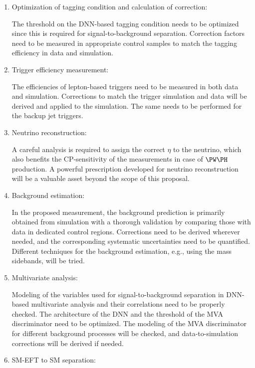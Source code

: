 \documentclass[a4paper,11pt]{article}
\begin{document}
\begin{enumerate}
\item Optimization of \PH tagging condition and calculation of correction:

The threshold on the DNN-based \PH tagging condition needs to be optimized since this is required for signal-to-background separation. 
Correction factors 
need to be measured in appropriate control samples
to match the tagging efficiency in data and simulation.

\item Trigger efficiency measurement:

The efficiencies of lepton-based triggers need to be measured in both data and simulation. 
Corrections to match the trigger simulation and data will be derived and applied to the simulation. 
The same needs to be performed for the backup jet triggers. 

\item Neutrino reconstruction:

A careful analysis is required to assign the correct $\eta$ to the neutrino, which also benefits the CP-sensitivity of the measurements in case of $\PW\PH$ production. 
A powerful prescription developed for neutrino reconstruction 
will be a valuable asset beyond the scope of this proposal.

\item Background estimation:

In the proposed measurement, 
the background prediction is primarily obtained
from simulation with a thorough validation by comparing those with data in dedicated control regions. 
Corrections need to be derived wherever needed, and the corresponding systematic uncertainties need to be quantified.   
Different techniques for the background estimation, e.g., using the mass sidebands, will be tried.

\item Multivariate analysis: 

Modeling of the variables used for signal-to-background separation in DNN-based multivariate analysis and their correlations need to be properly checked. 
The architecture of the DNN and the threshold of the MVA discriminator need to be optimized. 
The modeling of the MVA discriminator for different background processes will be checked, 
and data-to-simulation corrections will be derived if needed. 

\item SM-EFT to SM separation: 


\end{enumerate}
\end{document}

